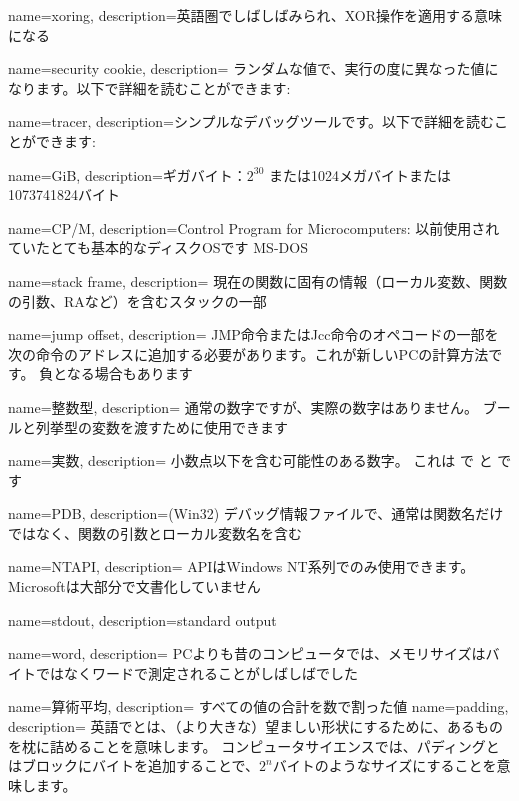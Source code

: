 {
  name=xoring,
  description={英語圏でしばしばみられ、\ac{XOR}操作を適用する意味になる}
}

{
  name=security cookie,
  description={
  ランダムな値で、実行の度に異なった値になります。以下で詳細を読むことができます: }
}

{
  name=tracer,
  description={シンプルなデバッグツールです。以下で詳細を読むことができます: }
}

{
  name=GiB,
  description={ギガバイト：$2^{30}$ または1024メガバイトまたは1073741824バイト}
}

{
  name=CP/M,
  description={Control Program for Microcomputers: 以前使用されていたとても基本的なディスク\ac{OS}です MS-DOS}
}

{
  name=stack frame,
  description=
  {現在の関数に固有の情報（ローカル変数、関数の引数、\ac{RA}など）を含むスタックの一部}
}

{
  name=jump offset,
  description=
  {JMP命令またはJcc命令のオペコードの一部を次の命令のアドレスに追加する必要があります。これが新しい\ac{PC}の計算方法です。 負となる場合もあります}
}

{
  name=整数型,
  description=
  {通常の数字ですが、実際の数字はありません。 ブールと列挙型の変数を渡すために使用できます}
}

{
  name=実数,
  description={
  小数点以下を含む可能性のある数字。 これは \CCpp で \Tfloat と \Tdouble です
  }
}

{
  name=PDB,
  description={(Win32) 
  デバッグ情報ファイルで、通常は関数名だけではなく、関数の引数とローカル変数名を含む}
}

{
  name=NTAPI,
  description=
  {APIはWindows NT系列でのみ使用できます。 Microsoftは大部分で文書化していません}
}

{
  name=stdout,
  description={standard output}
}

{
  name=word,
  description=
  {PCよりも昔のコンピュータでは、メモリサイズはバイトではなくワードで測定されることがしばしばでした}
}

{
  name={算術平均},
  description=
  {すべての値の合計を数で割った値}
}
{
  name=padding,
  description=
  {英語でとは、（より大きな）望ましい形状にするために、あるものを枕に詰めることを意味します。
  コンピュータサイエンスでは、パディングとはブロックにバイトを追加することで、$2^n$バイトのようなサイズにすることを意味します。}
}

